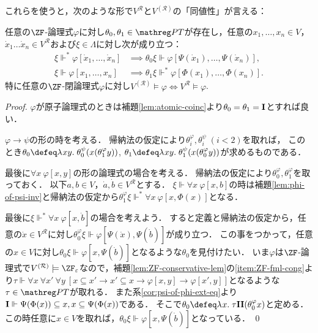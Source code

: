 \documentclass[realisability.tex]{subfiles}
\begin{document}
これらを使うと，次のような形で$V^{\mathcal{R}}$と$V^{(\mathcal{R})}$の「同値性」が言える：
\begin{theorem}
 任意の$\ZF$-論理式$\varphi$に対し$\theta_0, \theta_1 \in \PT$が存在し，任意の$x_1, \dots, x_n \in V$，$\dot{x}_1 \dots \dot{x}_n \in V^{\mathcal{R}}$および$\xi \in \Lambda$に対し次が成り立つ：
 \begin{align*}
  \xi \Vdash^* \varphi[\dot{x}_1, \dots, \dot{x}_n] &\implies \theta_0 \xi \Vdash \varphi[\Psi(\dot{x}_1), \dots, \Psi(\dot{x}_n)],\\
  \xi \Vdash \varphi[x_1, \dots, x_n] &\implies \theta_1 \xi \Vdash^* \varphi[\Phi(x_1), \dots, \Phi(x_n)].
 \end{align*}
 特に任意の$\ZF$-閉論理式$\varphi$に対し$V^{(\mathcal{R})} \models \varphi \iff V^{\mathcal{R}} \models \varphi$.
\end{theorem}
\begin{proof}
 $\varphi$が原子論理式のときは補題\ref{lem:atomic-coinc}より$\theta_0 = \theta_1 = \mathsf{\mathbf{I}}$とすれば良い．

 $\varphi \to \psi$の形の時を考える．
 帰納法の仮定により$\theta^\varphi_i, \theta^\psi_i\;(i < 2)$を取れば，
 このとき$\theta_0 \defeq \abs{xy}{\theta^\psi_0(x(\theta^\varphi_1 y))}$, $\theta_1 \defeq \abs{xy}{\theta^\psi_1(x(\theta^\varphi_0 y))}$が求めるものである．

 最後に$\forall x \: \varphi[x, y]$の形の論理式の場合を考える．
 帰納法の仮定により$\theta^\varphi_0, \theta^\varphi_1$を取っておく．
 以下$a,b \in V$，$\dot{a}, \dot{b} \in V^{\mathcal{R}}$とする．
 $\xi \Vdash \forall x \: \varphi[x, b]$の時は補題\ref{lem:phi-of-psi-inv}と帰納法の仮定から$\theta^\varphi_1 \xi \Vdash^* \forall x \: \varphi[x, \Phi(x)]$となる．

 最後に$\xi \Vdash^* \forall x \: \varphi[x, \dot{b}]$の場合を考えよう．
 すると定義と帰納法の仮定から，任意の$\dot{x} \in V^{\mathcal{R}}$に対し$\theta^\varphi_0 \xi \Vdash \varphi[\Psi(\dot{x}), \Psi(\dot{b})]$が成り立つ．
 この事をつかって，任意の$x \in V$に対し$\theta_0 \xi \Vdash \varphi[x, \Psi(\dot{b})]$となるような$\theta_0$を見付けたい．
 いま$\varphi$は$\ZF$-論理式で$V^{(\mathcal{R})} \models \ZFe$なので，補題\ref{lem:ZF-conservative-lem}の\ref{item:ZF-fml-cong}より$\tau \Vdash \forall x \: \forall x'\: \forall y \: [x \subseteq x' \to x' \subseteq x \to \varphi[x, y] \to \varphi[x', y]]$となるような$\tau \in \PT$が取れる．
 また系\ref{cor:psi-of-phi-ext-eq}より$\mathsf{\mathbf{I}} \Vdash \Psi(\Phi(x)) \subseteq x, x \subseteq \Psi(\Phi(x))$である．
 そこで$\theta_0 \defeq \abs{x}{\tau\I\I(\theta^\varphi_0 x)}$と定める．
 この時任意に$x \in V$を取れば，$\theta_0 \xi \Vdash \varphi[x, \Psi(\dot{b})]$となっている． \qed
\end{proof}
\end{document}
